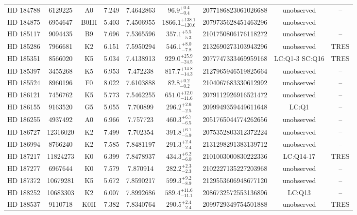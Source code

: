 \begin{table*}
\begin{tabular}{ccccccccc}
HD 184788 & 6129225 & A0 & 7.249 & 7.4642863 & $96.9^{+0.4}_{-0.4}$ & 2077186823061026688 & unobserved & -- \\
HD 184875 & 6954647 & B0III & 5.403 & 7.4506955 & $1866.1^{+138.1}_{-120.6}$ & 2079735628451463296 & unobserved & -- \\
HD 185117 & 9094435 & B9 & 7.696 & 7.5365596 & $357.1^{+5.5}_{-5.3}$ & 2101750806176118272 & unobserved & -- \\
HD 185286 & 7966681 & K2 & 6.151 & 7.5950294 & $546.1^{+8.0}_{-7.8}$ & 2132690273103943296 & unobserved & TRES \\
HD 185351 & 8566020 & K5 & 5.034 & 7.4138913 & $929.0^{+25.9}_{-24.5}$ & 2077747333469959168 & LC:Q1-3 SC:Q16 & TRES \\
HD 185397 & 3455268 & K5 & 6.953 & 7.472238 & $817.7^{+14.8}_{-14.3}$ & 2127965946519825664 & unobserved & -- \\
HD 185524 & 8960196 & F0 & 8.022 & 7.6103888 & $82.8^{+0.2}_{-0.2}$ & 2104067683330612992 & unobserved & -- \\
HD 186121 & 7456762 & K5 & 5.773 & 7.5462255 & $651.0^{+12.0}_{-11.6}$ & 2079112926916521472 & unobserved & -- \\
HD 186155 & 9163520 & G5 & 5.055 & 7.700899 & $296.2^{+2.6}_{-2.5}$ & 2099949359449611648 & LC:Q1 & -- \\
HD 186255 & 4937492 & A0 & 6.966 & 7.757723 & $460.3^{+6.7}_{-6.5}$ & 2051765044774262656 & unobserved & -- \\
HD 186727 & 12316020 & K2 & 7.499 & 7.702354 & $391.8^{+6.1}_{-5.9}$ & 2075352803312372224 & unobserved & -- \\
HD 186994 & 8766240 & K2 & 7.585 & 7.8481197 & $291.3^{+2.4}_{-2.4}$ & 2131298291383139712 & unobserved & -- \\
HD 187217 & 11824273 & K0 & 6.399 & 7.8478937 & $434.3^{+6.2}_{-6.0}$ & 2101003000830222336 & LC:Q14-17 & TRES \\
HD 187277 & 6967644 & K0 & 7.579 & 7.870914 & $282.2^{+2.3}_{-2.3}$ & 2102227135227203968 & unobserved & -- \\
HD 187372 & 10679281 & K5 & 5.672 & 7.8590217 & $599.3^{+9.2}_{-8.9}$ & 2129553606948677120 & unobserved & -- \\
HD 188252 & 10683303 & K2 & 6.007 & 7.8992686 & $589.4^{+11.6}_{-11.1}$ & 2086732572553136896 & LC:Q13 & -- \\
HD 188537 & 9110718 & K0II & 7.382 & 7.8340764 & $290.5^{+2.4}_{-2.4}$ & 2099729349754501888 & unobserved & TRES \\

\end{tabular}
\end{table*}
